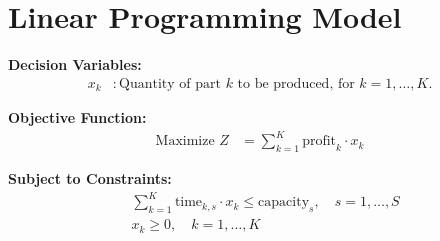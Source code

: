 \documentclass{article}
\begin{document}
\section*{Linear Programming Model}

\textbf{Decision Variables:}
\begin{align*}
x_k &: \text{Quantity of part } k \text{ to be produced, for } k = 1, \ldots, K.
\end{align*}

\textbf{Objective Function:}
\begin{align*}
\text{Maximize } Z &= \sum_{k=1}^{K} \text{profit}_k \cdot x_k
\end{align*}

\textbf{Subject to Constraints:}
\begin{align*}
&\sum_{k=1}^{K} \text{time}_{k,s} \cdot x_k \leq \text{capacity}_s, \quad s = 1, \ldots, S \\
&x_k \geq 0, \quad k = 1, \ldots, K
\end{align*}
\end{document}
